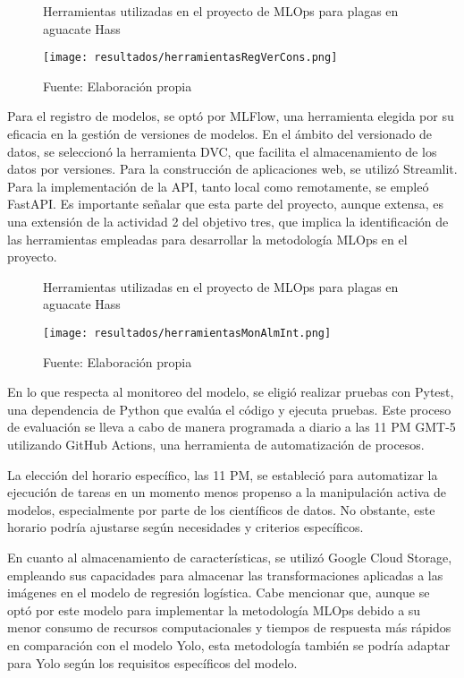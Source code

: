 \begin{figure}[h]
\centering
\caption{Herramientas utilizadas en el proyecto de MLOps para plagas en aguacate Hass}
\texttt{[image: resultados/herramientasRegVerCons.png]}
\caption*{\footnotesize Fuente: Elaboración propia}
\label{fig:figuraHerramientasRegVerCons}
\end{figure}

\newpage

Para el registro de modelos, se optó por MLFlow, una herramienta elegida por su eficacia en la gestión de versiones de modelos. En el ámbito del versionado de datos, se seleccionó la herramienta DVC, que facilita el almacenamiento de los datos por versiones. Para la construcción de aplicaciones web, se utilizó Streamlit. Para la implementación de la API, tanto local como remotamente, se empleó FastAPI. Es importante señalar que esta parte del proyecto, aunque extensa, es una extensión de la actividad 2 del objetivo tres, que implica la identificación de las herramientas empleadas para desarrollar la metodología MLOps en el proyecto.

\begin{figure}[h]
\centering
\caption{Herramientas utilizadas en el proyecto de MLOps para plagas en aguacate Hass}
\texttt{[image: resultados/herramientasMonAlmInt.png]}
\caption*{\footnotesize Fuente: Elaboración propia}
\label{fig:figuraHerramientasMonAlmInt}
\end{figure}

En lo que respecta al monitoreo del modelo, se eligió realizar pruebas con Pytest, una dependencia de Python que evalúa el código y ejecuta pruebas. Este proceso de evaluación se lleva a cabo de manera programada a diario a las 11 PM GMT-5 utilizando GitHub Actions, una herramienta de automatización de procesos. \newline

La elección del horario específico, las 11 PM, se estableció para automatizar la ejecución de tareas en un momento menos propenso a la manipulación activa de modelos, especialmente por parte de los científicos de datos. No obstante, este horario podría ajustarse según necesidades y criterios específicos. \newline

En cuanto al almacenamiento de características, se utilizó Google Cloud Storage, empleando sus capacidades para almacenar las transformaciones aplicadas a las imágenes en el modelo de regresión logística. Cabe mencionar que, aunque se optó por este modelo para implementar la metodología MLOps debido a su menor consumo de recursos computacionales y tiempos de respuesta más rápidos en comparación con el modelo Yolo, esta metodología también se podría adaptar para Yolo según los requisitos específicos del modelo. \newline

